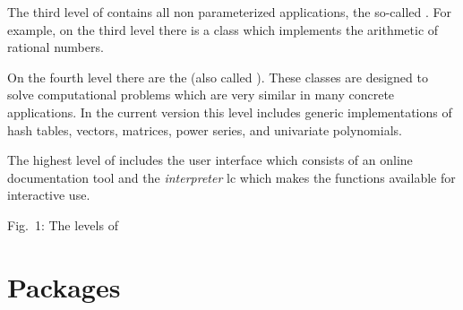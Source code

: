 The third level of \LiDIA contains all non parameterized \LiDIA applications, the so-called
.  For example, on the third level there is a class 
which implements the arithmetic of rational numbers.

On the fourth \LiDIA level there are the  (also called
).  These classes are designed to solve computational problems which are
very similar in many concrete applications.  In the current version this level includes generic
implementations of hash tables, vectors, matrices, power series, and univariate polynomials.

The highest level of \LiDIA includes the user interface which consists of an online
documentation tool and the \emph{interpreter} lc \index{\lc} which makes the \LiDIA
functions available for interactive use.

\label{LidFig}
\begin{center}
  

  Fig.~1: The levels of \LiDIA
\end{center}


\section{Packages}

